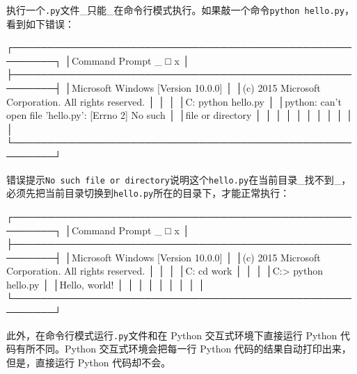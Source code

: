 执行一个\texttt{.py}文件\_只能\_在命令行模式执行。如果敲一个命令\texttt{python\ hello.py}，看到如下错误：

\begin{pythoncode}
┌────────────────────────────────────────────────────────┐
│Command Prompt                                    _ □ x │
├────────────────────────────────────────────────────────┤
│Microsoft Windows [Version 10.0.0]                      │
│(c) 2015 Microsoft Corporation. All rights reserved.    │
│                                                        │
│C:\> python hello.py                                    │
│python: can't open file 'hello.py': [Errno 2] No such   │
│file or directory                                       │
│                                                        │
│                                                        │
│                                                        │
│                                                        │
│                                                        │
└────────────────────────────────────────────────────────┘
\end{pythoncode}

错误提示\texttt{No\ such\ file\ or\ directory}说明这个\texttt{hello.py}在当前目录\_找不到\_，必须先把当前目录切换到\texttt{hello.py}所在的目录下，才能正常执行：

\begin{pythoncode}
┌────────────────────────────────────────────────────────┐
│Command Prompt                                    _ □ x │
├────────────────────────────────────────────────────────┤
│Microsoft Windows [Version 10.0.0]                      │
│(c) 2015 Microsoft Corporation. All rights reserved.    │
│                                                        │
│C:\> cd work                                            │
│                                                        │
│C:\work> python hello.py                                │
│Hello, world!                                           │
│                                                        │
│                                                        │
│                                                        │
│                                                        │
└────────────────────────────────────────────────────────┘
\end{pythoncode}

此外，在命令行模式运行\texttt{.py}文件和在 Python 交互式环境下直接运行
Python 代码有所不同。Python 交互式环境会把每一行 Python
代码的结果自动打印出来，但是，直接运行 Python 代码却不会。

